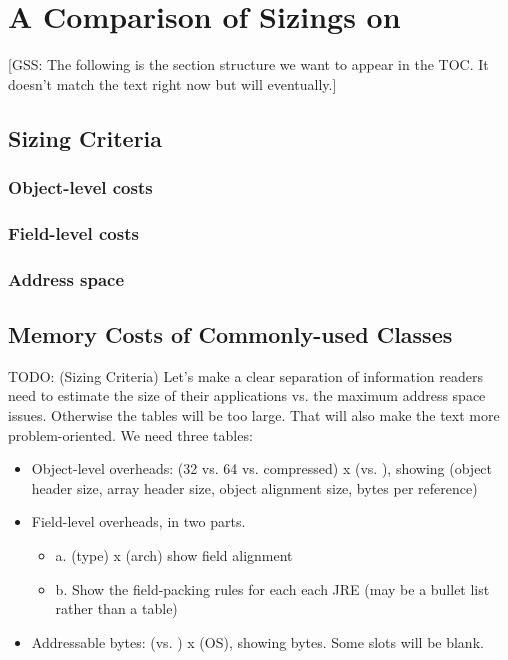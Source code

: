 \chapter{A Comparison of Sizings on \jres}
\label{chapter:jre-comparison}

[GSS: The following is the section structure we want to appear in the TOC.  It
doesn't match the text right now but will eventually.]
\section{Sizing Criteria}
\subsection{Object-level costs}
\subsection{Field-level costs}
\subsection{Address space}
\section{Memory Costs of Commonly-used Classes}


TODO: (Sizing Criteria) Let's make a clear separation of information readers
need to estimate the size of their applications vs. the maximum address space issues.  Otherwise the
tables will be too large. That will also make the text more
problem-oriented.  We need three tables:
\begin{itemize}
\item Object-level overheads: (32 vs. 64 vs. compressed) x (\oracle vs. \ibm),
showing (object header size, array header size, object alignment size, bytes per
reference) 
\item Field-level overheads, in two parts.
\begin{itemize}
  \item a. (type) x (arch) show field alignment
  \item b. Show the field-packing rules for each each JRE (may be a bullet list
rather than a table)
\end{itemize}
\item Addressable bytes: (\oracle vs. \ibm) x (OS), showing bytes.  Some slots will
be blank.
\end{itemize}

